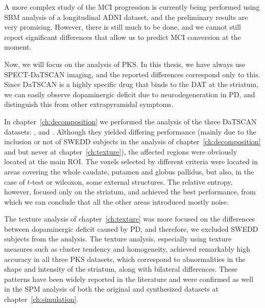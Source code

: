 A more complex study of the \ac{MCI} progression is currently being performed using \ac{SBM} analysis of a longitudinal \ac{ADNI} dataset, and the preliminary results are very promising. However, there is still much to be done, and we cannot still report significant differences that allow us to predict \ac{MCI} conversion at the moment. 

Now, we will focus on the analysis of \ac{PKS}. In this thesis, we have always use \ac{SPECT}-DaTSCAN imaging, and the reported differences correspond only to this. Since DaTSCAN is a highly specific drug that binds to the \acs{DAT} at the striatum, we can easily observe dopaminergic deficit due to neurodegeneration in \ac{PD}, and distinguish this from other extrapyramidal symptoms. 

In chapter~\ref{ch:decomposition} we performed the analysis of the three DaTSCAN datasets: \ppmidat{}, \vdlndat{} and \vdlvdat{}. Although they yielded differing performance (mainly due to the inclusion or not of \ac{SWEDD} subjects in the analysis of chapter~\ref{ch:decomposition} and but never at chapter~\ref{ch:texture}), the affected regions were obviously located at the main \ac{ROI}. The voxels selected by different criteria were located in areas covering the whole caudate, putamen and globus pallidus, but also, in the case of $t$-test or wilcoxon, some external structures. The relative entropy, however, focused only on the striatum, and achieved the best performance, from which we can conclude that all the other areas introduced mostly noise.

The texture analysis of chapter~\ref{ch:texture} was more focused on the differences between dopaminergic deficit caused by \ac{PD}, and therefore, we excluded \ac{SWEDD} subjects from the analysis. The texture analysis, especially using texture measures such as cluster tendency and homogeneity, achieved remarkably high accuracy in all three \ac{PKS} datasets, which correspond to abnormalities in the shape and intensity of the striatum, along with bilateral differences. These patterns have been widely reported in the literature \cite{Towey2011,Illan2012,martinez2014parametrization} and were confirmed as well in the \ac{SPM} analysis of both the original and synthesized datasets at chapter~\ref{ch:simulation}. 

